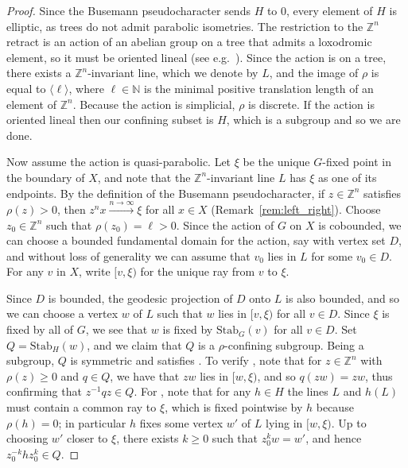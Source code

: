 \documentclass[10pt,a4paper]{article}
\theoremstyle{definition}
\theoremstyle{remark}
\newcommand{\N}{\mathbb{N}}
\newcommand{\Z}{\mathbb{Z}}
\newcommand{\Stab}{\mathrm{Stab}}
\theoremstyle{plain}
\begin{document}
\begin{proof}
Since the Busemann pseudocharacter sends $H$ to $0$, every element of $H$ is elliptic, as trees do not admit parabolic isometries. The restriction to the $\Z^n$ retract is an action of an abelian group on a tree that admits a loxodromic element, so it must be oriented lineal (see e.g.~\cite[Proposition 3.2]{NL}). Since the action is on a tree, there exists a $\Z^n$-invariant line, which we denote by $L$, and the image of $\rho$ is equal to $\langle \ell \rangle$, where $\ell \in \N$ is the minimal positive translation length of an element of $\Z^n$. Because the action is simplicial, $\rho$ is discrete. 
If the action is oriented lineal then our confining subset is $H$, which is a subgroup and so we are done.

Now assume the action is quasi-parabolic. Let $\xi$ be the unique $G$-fixed point in the boundary of $X$, and note that the $\Z^n$-invariant line $L$ has $\xi$ as one of its endpoints. By the definition of the Busemann pseudocharacter, if $z \in \Z^n$ satisfies $\rho(z) > 0$, then $z^n x \xrightarrow{n \to \infty} \xi$ for all $x \in X$ (Remark~\ref{rem:left_right}). Choose $z_0\in\Z^n$ such that $\rho(z_0) = \ell > 0$. Since the action of $G$ on $X$ is cobounded, we can choose a bounded fundamental domain for the action, say with vertex set $D$, and without loss of generality we can assume that $v_0$ lies in $L$ for some $v_0\in D$. For any $v$ in $X$, write $[v,\xi)$ for the unique ray from $v$ to $\xi$.

Since $D$ is bounded, the geodesic projection of $D$ onto $L$ is also bounded, and so we can choose a vertex $w$ of $L$ such that $w$ lies in $[v,\xi)$ for all $v\in D$. Since $\xi$ is fixed by all of $G$, we see that $w$ is fixed by $\Stab_G(v)$ for all $v\in D$. Set $Q=\Stab_H(w)$, and we claim that $Q$ is a $\rho$-confining subgroup. Being a subgroup, $Q$ is symmetric and satisfies \ProdConf. To verify \StayInConf, note that for $z\in \Z^n$ with $\rho(z)\ge 0$ and $q\in Q$, we have that $zw$ lies in $[w,\xi)$, and so $q(zw)=zw$, thus confirming that $z^{-1}qz\in Q$. For \GetInConf, note that for any $h\in H$ the lines $L$ and $h(L)$ must contain a common ray to $\xi$, which is fixed pointwise by $h$ because $\rho(h) = 0$; in particular $h$ fixes some vertex $w'$ of $L$ lying in $[w,\xi)$. Up to choosing $w'$ closer to $\xi$, there exists $k \geq 0$ such that $z_0^k w = w'$, and hence $z_0^{-k}hz_0^k\in Q$.


\end{proof}
\end{document}
